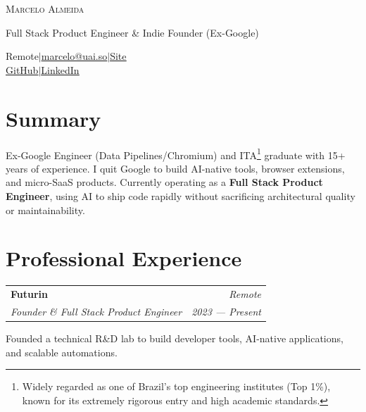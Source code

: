 \documentclass[11pt,letterpaper]{article}
\makeatletter
\newcommand{\resumelink}[2]{\href{#1}{\underline{#2}}}
\newcommand{\resumeSep}{\enspace$\vert$\enspace}
\newcommand{\resumeSubheading}[4]{%
  \vspace{0.12em}%
  \noindent
  \begin{tabular*}{\textwidth}{@{}p{0.68\textwidth}@{\extracolsep{\fill}}r@{}}
    {\bfseries #1} & {\textit{#2}} \\
    {\small\textit{#3}} & {\small\textit{#4}}
  \end{tabular*}%
  \par\vspace{0.06em}%
}
\makeatother
\begin{document}
\begin{center}
  {\Huge\scshape Marcelo Almeida}\par\vspace{0.15em}
  {\normalsize Full Stack Product Engineer \& Indie Founder (Ex-Google)}\par\vspace{0.35em}
  {\small
    Remote\resumeSep\resumelink{mailto:marcelo@uai.so}{marcelo@uai.so}\resumeSep\resumelink{https://marcelo.land}{Site}\\
    \resumelink{https://github.com/marcelocra}{GitHub}\resumeSep\resumelink{https://linkedin.com/in/marcelocra}{LinkedIn}
  }
\end{center}

\section{Summary}

Ex-Google Engineer (Data Pipelines/Chromium) and ITA\footnote{Widely regarded as one of Brazil's top engineering institutes (Top 1\%), known for its extremely rigorous entry and high academic standards.} graduate with 15+ years of experience. I quit Google to build AI-native tools, browser extensions, and micro-SaaS products. Currently operating as a \textbf{Full Stack Product Engineer}, using AI to ship code rapidly without sacrificing architectural quality or maintainability.

\section{Professional Experience}

\resumeSubheading{Futurin}{Remote}{Founder \& Full Stack Product Engineer}{2023 --- Present}

Founded a technical R\&D lab to build developer tools, AI-native applications, and scalable automations.
\end{document}

